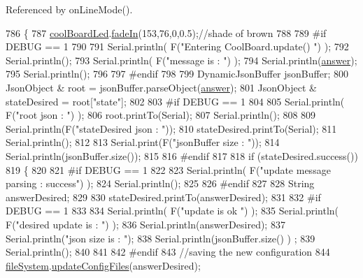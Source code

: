Referenced by on\+Line\+Mode().


\begin{DoxyCode}
786 \{
787     \hyperlink{classCoolBoard_a1b1d3c684a5baa56b08486e192fd8e97}{coolBoardLed}.\hyperlink{classCoolBoardLed_ab778f5e7bed0ab74e3906d82110493c3}{fadeIn}(153,76,0,0.5);\textcolor{comment}{//shade of brown        }
788 
789 \textcolor{preprocessor}{#if DEBUG == 1}
790 
791     Serial.println( F(\textcolor{stringliteral}{"Entering CoolBoard.update() "}) );
792     Serial.println();
793     Serial.println( F(\textcolor{stringliteral}{"message is : "}) );
794     Serial.println(\hyperlink{classCoolBoard_a7b835fafd449e5282f7f91d787a2dc15}{answer});
795     Serial.println();
796 
797 \textcolor{preprocessor}{#endif}
798 
799     DynamicJsonBuffer jsonBuffer;
800     JsonObject & root = jsonBuffer.parseObject(\hyperlink{classCoolBoard_a7b835fafd449e5282f7f91d787a2dc15}{answer});
801     JsonObject & stateDesired = root[\textcolor{stringliteral}{"state"}];
802 
803 \textcolor{preprocessor}{#if DEBUG == 1}
804 
805     Serial.println( F(\textcolor{stringliteral}{"root json : "}) );
806     root.printTo(Serial);
807     Serial.println();
808 
809     Serial.println(F(\textcolor{stringliteral}{"stateDesired json : "}));
810     stateDesired.printTo(Serial);
811     Serial.println();
812     
813     Serial.print(F(\textcolor{stringliteral}{"jsonBuffer size : "}));
814     Serial.println(jsonBuffer.size());
815 
816 \textcolor{preprocessor}{#endif}
817 
818     \textcolor{keywordflow}{if} (stateDesired.success())
819     \{
820     
821 \textcolor{preprocessor}{    #if DEBUG == 1}
822 
823         Serial.println( F(\textcolor{stringliteral}{"update message parsing : success"}) );
824         Serial.println();
825     
826 \textcolor{preprocessor}{    #endif}
827 
828             String answerDesired;
829         
830             stateDesired.printTo(answerDesired);
831             
832 \textcolor{preprocessor}{        #if DEBUG == 1      }
833         
834             Serial.println( F(\textcolor{stringliteral}{"update is ok "}) );
835             Serial.println( F(\textcolor{stringliteral}{"desired update is : "}) );            
836             Serial.println(answerDesired);
837             Serial.println(\textcolor{stringliteral}{"json size is : "});
838             Serial.println(jsonBuffer.size() ) ;                
839             Serial.println();
840 
841         
842 \textcolor{preprocessor}{        #endif}
843             \textcolor{comment}{//saving the new configuration}
844             \hyperlink{classCoolBoard_a42c2586fbb13ff7f06538e9284e8538d}{fileSystem}.\hyperlink{classCoolFileSystem_adfa8e2e80641ae6f0cceabd348a9b841}{updateConfigFiles}(answerDesired);

\end{DoxyCode}
